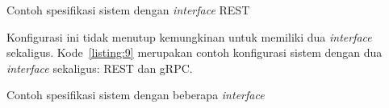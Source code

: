 \begin{code}
	\caption{Contoh spesifikasi sistem dengan \textit{interface} REST}\label{listing:8}
\end{code}

Konfigurasi ini tidak menutup kemungkinan untuk memiliki dua \textit{interface} sekaligus.
Kode~\ref{listing:9} merupakan contoh konfigurasi sistem dengan dua \textit{interface} sekaligus: REST dan gRPC.\@

\begin{code}
	\caption{Contoh spesifikasi sistem dengan beberapa \textit{interface}}\label{listing:9}
\end{code}
